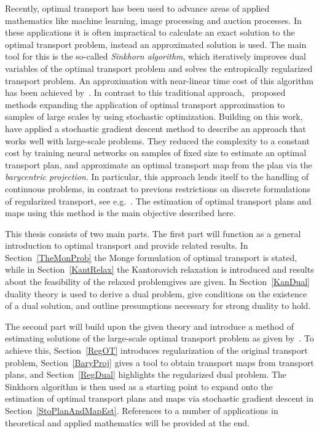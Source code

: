 Recently, optimal transport has been used to advance areas of applied mathematics like machine learning, image processing and auction processes. In these applications it is often impractical to calculate an exact solution to the optimal transport problem, instead an approximated solution is used. The main tool for this is the so-called \textit{Sinkhorn algorithm}, which iteratively improves dual variables of the optimal transport problem and solves the entropically regularized transport problem. An approximation with near-linear time cost of this algorithm has been achieved by\ \cite{Alts2019}. In contrast to this traditional approach,\ \cite{Gene2016} proposed methods expanding the application of optimal transport approximation to samples of large scales by using stochastic optimization. Building on this work,\ \cite{Seg2018} have applied a stochastic gradient descent method to describe an approach that works well with large-scale problems. They reduced the complexity to a constant cost by training neural networks on samples of fixed size to estimate an optimal transport plan, and approximate an optimal transport map from the plan via the \textit{barycentric projection}. In particular, this approach lends itself to the handling of continuous problems, in contrast to previous restrictions on discrete formulations of regularized transport, see e.g.\ \cite{Ferra2013}. The estimation of optimal transport plans and maps using this method is the main objective described here.

This thesis consists of two main parts. The first part will function as a general introduction to optimal transport and provide related results. In Section~\ref{TheMonProb} the Monge formulation of optimal transport is stated, while in Section~\ref{KantRelax} the Kantorovich relaxation is introduced and results about the feasibility of the relaxed problemgives are given. In Section~\ref{KanDual} duality theory is used to derive a dual problem, give conditions on the existence of a dual solution, and outline presumptions necessary for strong duality to hold.

The second part will build upon the given theory and introduce a method of estimating solutions of the large-scale optimal transport problem as given by\ \cite{Seg2018}. To achieve this, Section~\ref{RegOT} introduces regularization of the original transport problem, Section~\ref{BaryProj} gives a tool to obtain transport maps from transport plans, and Section~\ref{RegDual} highlights the regularized dual problem. The Sinkhorn algorithm is then used as a starting point to expand onto the estimation of optimal transport plans and maps via stochastic gradient descent in Section~\ref{StoPlanAndMapEst}. References to a number of applications in theoretical and applied mathematics will be provided at the end.